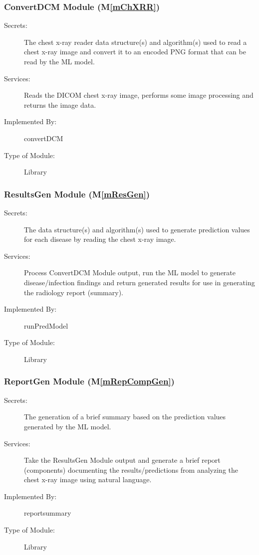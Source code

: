 \documentclass[12pt, titlepage]{article}
\newcommand{\mref}[1]{M\ref{#1}}
\begin{document}
\subsubsection{ConvertDCM Module (\mref{mChXRR})}

\begin{description}
\item[Secrets:] The chest x-ray reader data structure(s) and algorithm(s)
  used to read a chest x-ray image and convert it to an encoded PNG format that can be read by the ML model.
\item[Services:] Reads the DICOM chest x-ray image, performs some image processing and
  returns the image data.
\item[Implemented By:] convertDCM
\item[Type of Module:] Library
\end{description}

\subsubsection{ResultsGen Module (\mref{mResGen})}

\begin{description}
\item[Secrets:] The data structure(s) and algorithm(s) used to generate prediction values for each disease by reading the chest x-ray image.
\item[Services:] Process ConvertDCM Module output, run the ML model to generate disease/infection findings and return generated results for use in generating the radiology report (summary).
\item[Implemented By:] runPredModel
\item[Type of Module:] Library
\end{description}

\subsubsection{ReportGen Module (\mref{mRepCompGen})}

\begin{description}
\item[Secrets:] The generation of a brief summary based on the prediction values generated by the ML model.
\item[Services:] Take the ResultsGen Module output and generate a brief
  report (components) documenting the results/predictions from analyzing the
  chest x-ray image using natural language.
\item[Implemented By:] reportsummary
\item[Type of Module:] Library
\end{description}
\end{document}
